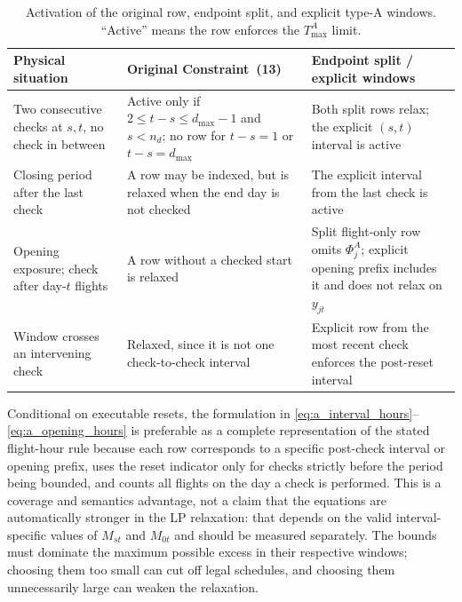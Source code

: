 \begin{table}[t]
\centering\small
\caption{Activation of the original row, endpoint split, and explicit
  type-A windows. ``Active'' means the row enforces the $T^A_{\max}$ limit.}
\label{tab:c13_activation}
\begin{tabularx}{\textwidth}{p{}XX}
\toprule
Physical situation & Original Constraint~(13) & Endpoint split / explicit windows \\
\midrule
Two consecutive checks at $s,t$, no check in between
  & Active only if $2\le t-s\le d_{\max}-1$ and $s<n_d$; no row for
    $t-s=1$ or $t-s=d_{\max}$
  & Both split rows relax; the explicit $(s,t)$ interval is active \\
Closing period after the last check
  & A row may be indexed, but is relaxed when the end day is not checked
  & The explicit interval from the last check is active \\
Opening exposure; check after day-$t$ flights
  & A row without a checked start is relaxed
  & Split flight-only row omits $\Phi^A_j$; explicit opening prefix includes it and does not relax on $y_{jt}$ \\
Window crosses an intervening check
  & Relaxed, since it is not one check-to-check interval
  & Explicit row from the most recent check enforces the post-reset interval \\
\bottomrule
\end{tabularx}
\end{table}

Conditional on executable resets, the formulation in
\eqref{eq:a_interval_hours}--\eqref{eq:a_opening_hours}
is preferable as a complete representation of the stated flight-hour rule
because each row corresponds to a specific post-check interval or opening
prefix, uses the reset indicator only for checks strictly before the period
being bounded, and counts all flights on the day a check is performed. This
is a coverage and semantics advantage, not a claim that the equations are
automatically stronger in the LP relaxation: that depends on the valid
interval-specific values of $M_{st}$ and $M_{0t}$ and should be measured
separately. The bounds must dominate the maximum possible excess in their
respective windows; choosing them too small can cut off legal schedules, and
choosing them unnecessarily large can weaken the relaxation.